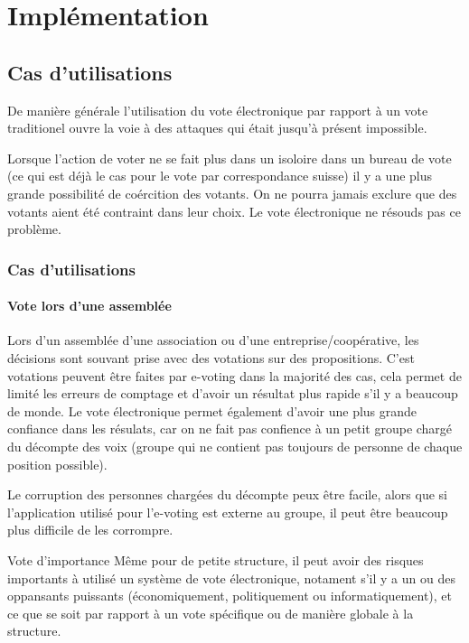 \documentclass[../report]{subfiles}
\begin{document}
\part{Implémentation}

\chapter{Cas d'utilisations}\label{chap:usecase}

De manière générale l'utilisation du vote électronique par rapport à un vote traditionel ouvre la voie à 
des attaques qui était jusqu'à présent impossible. 

Lorsque l'action de voter ne se fait plus dans un isoloire dans un bureau de vote (ce qui est déjà le cas
pour le vote par correspondance suisse) il y a une plus grande possibilité de coércition des votants.
On ne pourra jamais exclure que des votants aient été contraint dans leur choix. 
Le vote électronique ne résouds pas ce problème.

\section{Cas d'utilisations}
\subsection{Vote lors d'une assemblée}

Lors d'un assemblée d'une association ou d'une entreprise/coopérative, les décisions sont souvant prise avec
des votations sur des propositions.
C'est votations peuvent être faites par e-voting dans la majorité des cas, cela permet de limité les erreurs 
de comptage et d'avoir un résultat plus rapide s'il y a beaucoup de monde.
Le vote électronique permet également d'avoir une plus grande confiance dans les résulats, car on ne fait pas 
confience à un petit groupe chargé du décompte des voix (groupe qui ne contient pas toujours de personne de 
chaque position possible).

Le corruption des personnes chargées du décompte peux être facile, alors que si l'application utilisé pour
l'e-voting est externe au groupe, il peut être beaucoup plus difficile de les corrompre.

\begin{important}{Vote d'importance}
	Même pour de petite structure, il peut avoir des risques importants à utilisé un système de vote électronique, 
	notament s'il y a un ou des oppansants puissants (économiquement, politiquement ou informatiquement), et ce que
	se soit par rapport à un vote spécifique ou de manière globale à la structure.
\end{important}
\end{document}
